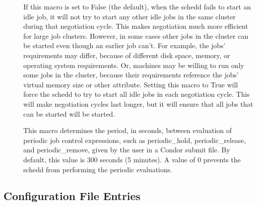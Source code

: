 \begin{description}
\item[]
  \label{param:NegotiateAllJobsInCluster}
  If this macro is set to False (the default), when the schedd fails
  to start an idle job, it will not try to start any other
  idle jobs in the same cluster during that negotiation cycle.  This
  makes negotiation much more efficient for large job clusters.
  However, in some cases other jobs in the cluster can be started even
  though an earlier job can't.  For example, the jobs' requirements
  may differ, because of different disk space, memory, or
  operating system requirements.  Or, machines may be willing to run
  only some jobs in the cluster, because their requirements reference
  the jobs' virtual memory size or other attribute.  Setting this
  macro to True will force the schedd to try to start all idle jobs in
  each negotiation cycle.  This will make negotiation cycles last
  longer, but it will ensure that all jobs that can be started will be
  started.

\item[]
  \label{param:PeriodicExprInterval} This macro determines the period,
  in seconds, between evaluation of periodic job control expressions,
  such as periodic\_hold, periodic\_release, and periodic\_remove,
  given by the user in a Condor submit file. By default, this value is
  300 seconds (5 minutes).  A value of 0 prevents the schedd from
  performing the periodic evaluations.
\end{description}

\subsection{\label{sec:Shadow-Config-File-Entries}
 Configuration File Entries}

